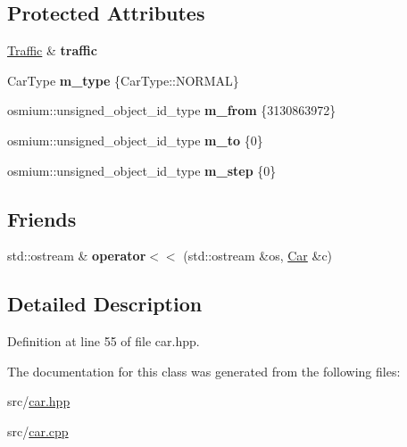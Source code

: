 \subsection*{Protected Attributes}
\begin{DoxyCompactItemize}
\item 
\hypertarget{classjustine_1_1robocar_1_1Car_a4f99adee89f8a1ca91f6fc030c97feca}{\hyperlink{classjustine_1_1robocar_1_1Traffic}{Traffic} \& {\bfseries traffic}}\label{classjustine_1_1robocar_1_1Car_a4f99adee89f8a1ca91f6fc030c97feca}

\item 
\hypertarget{classjustine_1_1robocar_1_1Car_ad155992312519e7fba23bdd860d615a8}{Car\-Type {\bfseries m\-\_\-type} \{Car\-Type\-::\-N\-O\-R\-M\-A\-L\}}\label{classjustine_1_1robocar_1_1Car_ad155992312519e7fba23bdd860d615a8}

\item 
\hypertarget{classjustine_1_1robocar_1_1Car_a0858b48ca22e62eaf8a7c36dc2c9705f}{osmium\-::unsigned\-\_\-object\-\_\-id\-\_\-type {\bfseries m\-\_\-from} \{3130863972\}}\label{classjustine_1_1robocar_1_1Car_a0858b48ca22e62eaf8a7c36dc2c9705f}

\item 
\hypertarget{classjustine_1_1robocar_1_1Car_a78c32854d0f75624343af5cba33fc725}{osmium\-::unsigned\-\_\-object\-\_\-id\-\_\-type {\bfseries m\-\_\-to} \{0\}}\label{classjustine_1_1robocar_1_1Car_a78c32854d0f75624343af5cba33fc725}

\item 
\hypertarget{classjustine_1_1robocar_1_1Car_ad1ea1c329f34b6f8e51f19067911201a}{osmium\-::unsigned\-\_\-object\-\_\-id\-\_\-type {\bfseries m\-\_\-step} \{0\}}\label{classjustine_1_1robocar_1_1Car_ad1ea1c329f34b6f8e51f19067911201a}

\end{DoxyCompactItemize}
\subsection*{Friends}
\begin{DoxyCompactItemize}
\item 
\hypertarget{classjustine_1_1robocar_1_1Car_a6d89810a4431b2bdbeeb0c9f31fee556}{std\-::ostream \& {\bfseries operator$<$$<$} (std\-::ostream \&os, \hyperlink{classjustine_1_1robocar_1_1Car}{Car} \&c)}\label{classjustine_1_1robocar_1_1Car_a6d89810a4431b2bdbeeb0c9f31fee556}

\end{DoxyCompactItemize}


\subsection{Detailed Description}


Definition at line 55 of file car.\-hpp.



The documentation for this class was generated from the following files\-:\begin{DoxyCompactItemize}
\item 
src/\hyperlink{car_8hpp}{car.\-hpp}\item 
src/\hyperlink{car_8cpp}{car.\-cpp}\end{DoxyCompactItemize}
